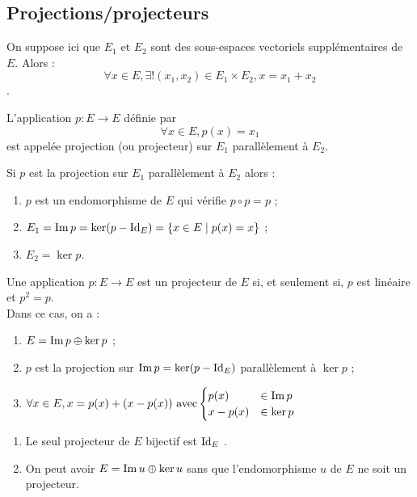 \subsection{Projections/projecteurs}
    On suppose ici que \(E_1\) et \(E_2\) sont des sous-espaces vectoriels supplémentaires de \(E\). Alors :
    \[\forall x \in  E, \exists!(x_1, x_2) \in  E_1 \times E_2, x = x_1 + x_2\].
\begin{defi}
    L’application \(p : E \to E\) définie par
    \[\forall x \in  E, p(x) = x_1\]
    est appelée projection (ou projecteur) sur \(E_1\) parallèlement à \(E_2\).
\end{defi}
\begin{prop}[Propriétés]
    Si \(p\) est la projection sur \(E_1\) parallèlement à \(E_2\) alors :
    \begin{enumerate}
        \item \(p\) est un endomorphisme de \(E\) qui vérifie \(p \circ p = p\) ;
        \item \(E_1 = \operatorname{Im} p = \ker (p - \mathrm{Id}_{E} ) = \left\lbrace x \in  E \;\middle|\; p(x) = x\right\rbrace\) ;
        \item \(E_2 = \ker p\).
    \end{enumerate}
\end{prop}

\begin{defprop}
    Une application \(p : E \to E\) est un projecteur de \(E\) si, et seulement si, \(p\) est linéaire et \(p^2 = p\).\\
    Dans ce cas, on a :
    \begin{enumerate}
        \item \(E = \operatorname{Im} p \oplus \ker p\) ;
        \item \(p\) est la projection sur \(\operatorname{Im} p = \ker (p - \mathrm{Id}_{E} )\) parallèlement à \(\ker p\) ;
        \item \(\forall x \in  E, x = p(x) + (x - p(x)) \text{ avec} \begin{cases}
            p(x) &\in  \operatorname{Im} p\\
            x - p(x) &\in  \ker p 
        \end{cases}\)
    \end{enumerate}
\end{defprop}
\begin{defprop}[Remarques]
    \begin{enumerate}
        \item Le seul projecteur de \(E\) bijectif est \(\mathrm{Id}_{E}\) .
        \item On peut avoir \(E = \operatorname{Im} u \oplus \ker u\) sans que l’endomorphisme \(u\) de \(E\) ne soit un projecteur.
    \end{enumerate}
\end{defprop}
